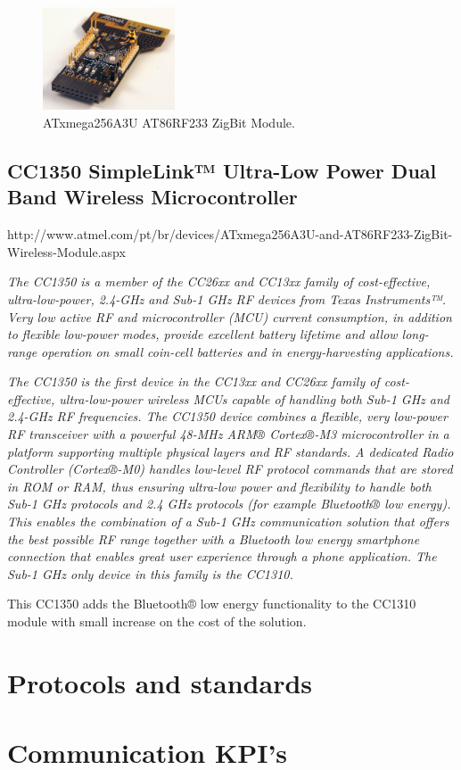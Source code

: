 \begin{figure}[h!]
	\centering
	\includegraphics[width=0.35\textwidth,keepaspectratio]{figures/atxmega}
	\caption{ATxmega256A3U AT86RF233 ZigBit Module.}
	
\end{figure}


\subsection{CC1350 SimpleLink™ Ultra-Low Power Dual Band Wireless Microcontroller}

\begin{framed}
	
	http://www.atmel.com/pt/br/devices/ATxmega256A3U-and-AT86RF233-ZigBit-Wireless-Module.aspx
	
	\vspace{1em}
	\hline
	\vspace{1em}
\small	
	\textit{The CC1350 is a member of the CC26xx and CC13xx family of cost-effective, ultra-low-power, 2.4-GHz and Sub-1 GHz RF devices from Texas Instruments™. Very low active RF and microcontroller (MCU) current consumption, in addition to flexible low-power modes, provide excellent battery lifetime and allow long-range operation on small coin-cell batteries and in energy-harvesting applications.}
		
		\textit{The CC1350 is the first device in the CC13xx and CC26xx family of cost-effective, ultra-low-power wireless MCUs capable of handling both Sub-1 GHz and 2.4-GHz RF frequencies. The CC1350 device combines a flexible, very low-power RF transceiver with a powerful 48-MHz ARM® Cortex®-M3 microcontroller in a platform supporting multiple physical layers and RF standards. A dedicated Radio Controller (Cortex®-M0) handles low-level RF protocol commands that are stored in ROM or RAM, thus ensuring ultra-low power and flexibility to handle both Sub-1 GHz protocols and 2.4 GHz protocols (for example Bluetooth® low energy). This enables the combination of a Sub-1 GHz communication solution that offers the best possible RF range together with a Bluetooth low energy smartphone connection that enables great user experience through a phone application. The Sub-1 GHz only device in this family is the CC1310.}
\end{framed}

This CC1350 adds the Bluetooth® low energy functionality to the CC1310 module with small increase on the cost of the solution. 

\section{Protocols and standards}
\lipsum[4]

\section{Communication KPI’s}
\lipsum[4]